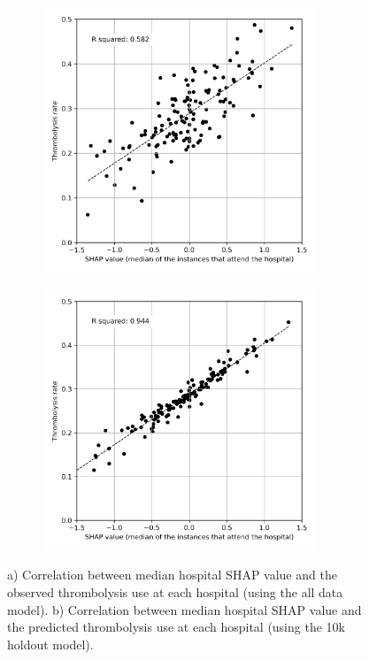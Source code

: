\begin{figure}[!h]
\centering
\begin{subfigure}{.49\textwidth}
  \centering
    \includegraphics[width=0.9\textwidth]{./images/03c_xgb_10_features_attended_hosp_shap_value}
    \caption{}
  \label{fig:shap_correlation_subfigure_a}
\end{subfigure}
\begin{subfigure}{.49\textwidth}
  \centering
    \includegraphics[width=0.9\textwidth]{./images/04_xgb_10_features_10k_cohort_attended_hosp_shap_value}
    \caption{}
  \label{fig:shap_correlation_subfigure_b}
\end{subfigure}
\caption{a) Correlation between median hospital SHAP value and the observed thrombolysis use at each hospital (using the all data model). b) Correlation between median hospital SHAP value and the predicted thrombolysis use at each hospital (using the 10k holdout model).}
\end{figure}


